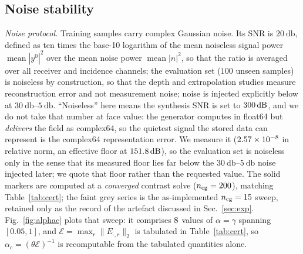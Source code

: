 \documentclass[journal,cmes,article,submit,moreauthors,pdftex]{Definitions/tsp}
\newcommand{\norm}[1]{\lVert #1 \rVert}
\newcommand{\mean}{\operatorname{mean}}
\newcommand{\numv}[1]{#1}
\begin{document}
\subsection{Noise stability}\label{sec:noise}

\emph{Noise protocol.} Training samples carry complex Gaussian
noise. Its SNR is $\SI{20}{\decibel}$, defined as ten times the base-10 logarithm of the mean
noiseless signal power $\mean|y^{0}|^{2}$ over the mean noise power $\mean|n|^{2}$, so that the
ratio is averaged over all receiver and incidence channels; the evaluation set ($100$ unseen samples) is
noiseless by construction, so that the depth and extrapolation studies measure reconstruction error
and not measurement noise; noise is injected explicitly below at
$\SI{30}{\decibel}$--$\SI{5}{\decibel}$. ``Noiseless'' here means the synthesis SNR is set to
$\SI{\numv{\NumNoiseNominalDb}}{\decibel}$, and we do not take that number at face value: the
generator computes in float64 but \emph{delivers} the field as complex64, so the quietest signal the
stored data can represent is the complex64 representation error. We measure it
($\numv{\NumNoiseFloorRel}$ in relative norm, an effective floor at
$\SI{\numv{\NumNoiseFloorDb}}{\decibel}$), so the evaluation set is noiseless only in the sense that
its measured floor lies far below the $\SI{30}{\decibel}$--$\SI{5}{\decibel}$ noise injected later;
we quote that floor rather than the requested value.
The solid markers are computed at a \emph{converged} contrast solve ($n_{\mathrm{cg}}=\numv{\NumNCgConv}$), matching Table~\ref{tab:cert}; the faint grey series is the as-implemented $n_{\mathrm{cg}}=\numv{\NumNCg}$ sweep, retained only as the record of the artefact discussed in Sec.~\ref{sec:exp}. Fig.~\ref{fig:alphac} plots that sweep: it comprises $\numv{\NumAlphaSweepN}$ values of $\alpha=\gamma$ spanning $[0.05,1]$, and $\mathcal{E}=\max_r\norm{E_{\cdot,r}}_2$ is tabulated in Table~\ref{tab:cert}, so $\alpha_c=(\theta\mathcal{E})^{-1}$ is recomputable from the tabulated quantities alone.
\end{document}
